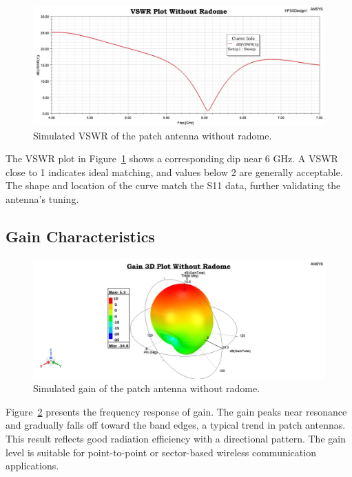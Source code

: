 \begin{figure}[H]
    \centering
    \includegraphics[width=1.0\textwidth]{figures/without_radome/VSWR.jpeg}
    \caption{Simulated VSWR of the patch antenna without radome.}
    \label{fig:res-without-vswr}
\end{figure}

The VSWR plot in Figure~\ref{fig:res-without-vswr} shows a corresponding dip near 6 GHz. A VSWR close to 1 indicates ideal matching, and values below 2 are generally acceptable. The shape and location of the curve match the S11 data, further validating the antenna's tuning.

\subsection{Gain Characteristics}

\begin{figure}[H]
    \centering
    \includegraphics[width=1.0\textwidth]{figures/without_radome/gain plot.jpeg}
    \caption{Simulated gain of the patch antenna without radome.}
    \label{fig:res-without-gain}
\end{figure}

Figure~\ref{fig:res-without-gain} presents the frequency response of gain. The gain peaks near resonance and gradually falls off toward the band edges, a typical trend in patch antennas. This result reflects good radiation efficiency with a directional pattern. The gain level is suitable for point-to-point or sector-based wireless communication applications.


